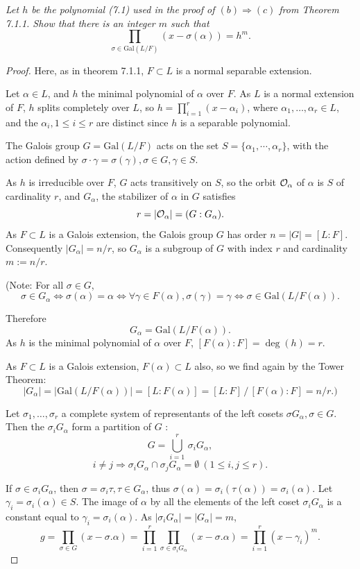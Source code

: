 \documentclass[11pt,a4paper]{article}
\newcommand{\Gal}{\mathrm{Gal}}
\begin{document}
{\it Let $h$ be the polynomial (7.1) used in the proof of $(b) \Rightarrow (c)$ from Theorem 7.1.1. Show that there is an integer $m$ such that
$$\prod_{\sigma \in \Gal(L/F)} (x - \sigma(\alpha)) = h^m.$$
}
\begin{proof}
Here, as in theorem 7.1.1, $F \subset L$ is a normal separable extension. 

Let $\alpha \in L$, and $h$ the minimal polynomial of $\alpha$ over $F$. As $L$ is a normal extension of $F$, $h$ splits completely over $L$, so $h = \prod\limits_{i=1}^r(x-\alpha_i)$, where $\alpha_1,\ldots,\alpha_r\in L$, and the $\alpha_i,1\leq i \leq r$ are distinct since $h$ is a separable polynomial. 

The Galois group $G = \Gal(L/F)$ acts on the set $S = \{\alpha_1,\cdots,\alpha_r\}$, with the action defined by $\sigma \cdot \gamma = \sigma(\gamma), \sigma \in G,\gamma\in S$.

As $h$ is irreducible over $F$, $G$ acts transitively on $S$, so the orbit ${\cal O}_{\alpha}$ of $\alpha$ is $S$ of cardinality $r$, and  $G_\alpha$, the stabilizer of $\alpha$ in $G$ satisfies
$$r = \vert {\cal O}_{\alpha} \vert = (G : G_\alpha).$$
As  $F\subset L$ is a Galois extension, the Galois group $G$ has order $n = \vert G \vert = [L:F]$.
Consequently $\vert G_\alpha \vert = n/r$, so $G_\alpha$ is a subgroup of $G$ with index $r$ and cardinality $m:=n/r$. 

\bigskip

 (Note: For all $\sigma \in G$, 
$$\sigma \in G_\alpha \iff \sigma(\alpha) = \alpha \iff \forall \gamma \in F(\alpha), \sigma(\gamma) = \gamma \iff \sigma \in \Gal(L/F(\alpha)).$$

Therefore
$$G_\alpha = \Gal(L/F(\alpha)).$$
As $h$ is the minimal  polynomial of $\alpha$ over $F$, $[F(\alpha) : F] = \deg(h) = r$. 

As $F \subset L$ is a Galois extension, $F(\alpha) \subset L$ also, so we find again by the Tower Theorem: 
$$\vert G_\alpha \vert  = \vert \Gal(L/F(\alpha))\vert = [L:F(\alpha)] = [L:F]\, / \,[F(\alpha):F] = n/r.)$$

\bigskip

Let $\sigma_1,\ldots,\sigma_r$ a complete system of representants of the left cosets $\sigma G_\alpha, \sigma \in G$. Then the $\sigma_i G_\alpha$ form a partition of $G$ : 
$$G = \bigcup_{i=1}^r \,\sigma_i G_\alpha,$$ $$i \neq j \Rightarrow \sigma_i G_\alpha \cap \sigma_j G_\alpha = \emptyset \ (1\leq i,j \leq r).$$

If $\sigma \in \sigma_iG_\alpha$, then $\sigma = \sigma_i \tau, \tau \in G_\alpha$, thus $\sigma(\alpha) =\sigma_i(\tau(\alpha)) = \sigma_i(\alpha)$. Let $\gamma_i =\sigma_i(\alpha)\in S$. The image of $\alpha$ by all the elements of the left coset $\sigma_iG_\alpha$ is a constant  equal to $\gamma_i = \sigma_i(\alpha)$. As $\vert \sigma_iG_\alpha \vert = \vert G_\alpha \vert= m$,
 $$g = \prod_{\sigma \in G} (x - \sigma.\alpha) = \prod_{i=1}^r \prod_{\sigma \in \sigma_i G_\alpha} (x - \sigma.\alpha) = \prod_{i=1}^r (x-\gamma_i)^m.$$


\end{proof}
\end{document}
